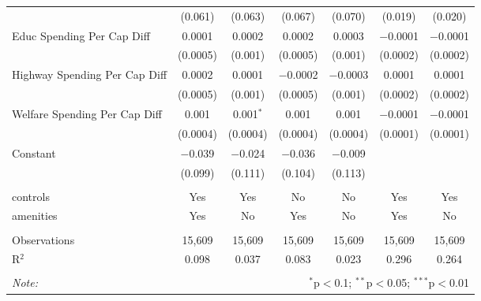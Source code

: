 \begin{table}[!htbp]
\begin{tabular}{@{\extracolsep{5pt}}lcccccc}
  & (0.061) & (0.063) & (0.067) & (0.070) & (0.019) & (0.020) \\ 
  Educ Spending Per Cap Diff & 0.0001 & 0.0002 & 0.0002 & 0.0003 & $-$0.0001 & $-$0.0001 \\ 
  & (0.0005) & (0.001) & (0.0005) & (0.001) & (0.0002) & (0.0002) \\ 
  Highway Spending Per Cap Diff & 0.0002 & 0.0001 & $-$0.0002 & $-$0.0003 & 0.0001 & 0.0001 \\ 
  & (0.0005) & (0.001) & (0.0005) & (0.001) & (0.0002) & (0.0002) \\ 
  Welfare Spending Per Cap Diff & 0.001 & 0.001$^{*}$ & 0.001 & 0.001 & $-$0.0001 & $-$0.0001 \\ 
  & (0.0004) & (0.0004) & (0.0004) & (0.0004) & (0.0001) & (0.0001) \\ 
  Constant & $-$0.039 & $-$0.024 & $-$0.036 & $-$0.009 &  &  \\ 
  & (0.099) & (0.111) & (0.104) & (0.113) &  &  \\ 
 \hline \\[-1.8ex] 
controls & Yes & Yes & No & No & Yes & Yes \\ 
amenities & Yes & No & Yes & No & Yes & No \\ 
\hline \\[-1.8ex] 
Observations & 15,609 & 15,609 & 15,609 & 15,609 & 15,609 & 15,609 \\ 
R$^{2}$ & 0.098 & 0.037 & 0.083 & 0.023 & 0.296 & 0.264 \\ 
\hline 
\hline \\[-1.8ex] 
\textit{Note:}  & \multicolumn{6}{r}{$^{*}$p$<$0.1; $^{**}$p$<$0.05; $^{***}$p$<$0.01} \\ 
\end{tabular} 
\end{table} 

